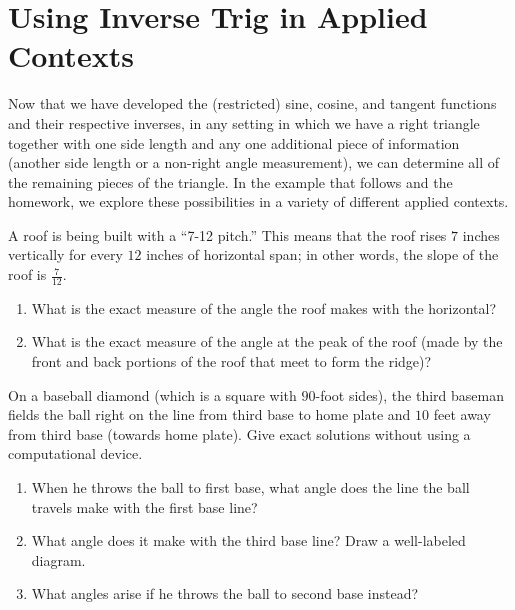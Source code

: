 \documentclass{ximera}
\begin{document}
\section{Using Inverse Trig in Applied Contexts}
%
Now that we have developed the (restricted) sine, cosine, and tangent functions and their respective inverses, in any setting in which we have a right triangle together with one side length and any one additional piece of information (another side length or a non-right angle measurement), we can determine all of the remaining pieces of the triangle. In the example that follows and the homework, we explore these possibilities in a variety of different applied contexts.
%
\begin{example}%
A roof is being built with a ``7-12 pitch.'' This means that the roof rises $7$ inches vertically for every $12$ inches of horizontal span; in other words, the slope of the roof is $\frac{7}{12}$. 
%
\begin{enumerate}
\item What is the exact measure of the angle the roof makes with the horizontal? \\
\begin{explanation}

\end{explanation}
\item What is the exact measure of the angle at the peak of the roof (made by the front and back portions of the roof that meet to form the ridge)?\\
%
\begin{explanation}

\end{explanation}
\end{enumerate}
\end{example}

\begin{exploration}
On a baseball diamond (which is a square with $90$-foot sides), the third baseman fields the ball right on the line from third base to home plate and $10$ feet away from third base (towards home plate).  
Give exact solutions without using a computational device.%
%
\begin{enumerate}
\item When he throws the ball to first base, what angle does the line the ball travels make with the first base line?
%
\item What angle does it make with the third base line? Draw a well-labeled diagram.
%
\item What angles arise if he throws the ball to second base instead?
%
\end{enumerate}
\end{exploration}
\end{document}

